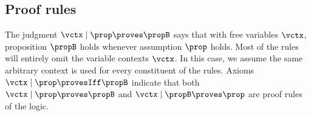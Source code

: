 
\subsection{Proof rules}
\label{sec:proof-rules}

The judgment $\vctx \mid \prop \proves \propB$ says that with free variables $\vctx$, proposition $\propB$ holds whenever assumption $\prop$ holds.
Most of the rules will entirely omit the variable contexts $\vctx$.
In this case, we assume the same arbitrary context is used for every constituent of the rules.
Axioms $\vctx \mid \prop \provesIff \propB$ indicate that both $\vctx \mid \prop \proves \propB$ and $\vctx \mid \propB \proves \prop$ are proof rules of the logic.


